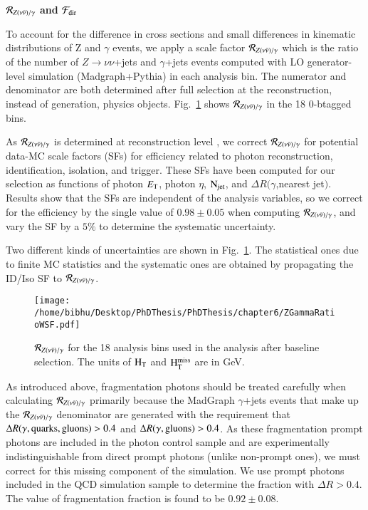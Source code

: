 {\bf ${\cal R}_{Z(\nu\bar{\nu})/\gamma}$ and ${\cal F}_{\rm dir}$}

To account for the difference in cross sections and small differences 
in kinematic distributions of Z and $\gamma$ events, we apply a scale 
factor ${\cal R}_{Z(\nu\bar{\nu})/\gamma}$ which is the ratio of the 
number of $Z\to\nu\nu$+jets and $\gamma$+jets events computed with 
LO generator-level simulation ({\sc Madgraph}+{\sc Pythia}) 
in each analysis bin.  The numerator and denominator are both determined 
after full selection at the reconstruction, instead of generation, physics 
objects. Fig.~\ref{fig:rzg} shows ${\cal R}_{Z(\nu\bar{\nu})/\gamma}$ in the 18 0-btagged bins. 


As ${\cal R}_{Z(\nu\bar{\nu})/\gamma}$ is determined at reconstruction level , we correct ${\cal R}_{Z(\nu\bar{\nu})/\gamma}$ for potential data-MC scale factors (SFs)  for efficiency related to photon reconstruction,  identification, isolation, and trigger.  
These SFs have been computed for our selection as functions of photon $E_{\rm T}$, photon 
$\eta$, $\rm N_{jet}$, and $\Delta R(\gamma$,nearest jet$)$.  Results show that 
the SFs are independent of the analysis variables, so we correct for the efficiency by the 
single value of $0.98\pm0.05$ when computing ${\cal R}_{Z(\nu\bar{\nu})/\gamma}$, and  
vary the SF by a $5\%$ to determine the systematic uncertainty.

Two different kinds of uncertainties are shown in Fig.~\ref{fig:rzg}. The statistical ones due to finite MC statistics and the systematic ones are obtained by propagating the ID/Iso SF to  ${\cal R}_{Z(\nu\bar{\nu})/\gamma}$.
  
\begin{figure}[h]
\begin{center}
  \texttt{[image: /home/bibhu/Desktop/PhDThesis/PhDThesis/chapter6/ZGammaRatioWSF.pdf]} %
  \caption{${\cal R}_{Z(\nu\bar{\nu})/\gamma}$ for the 18 analysis bins used in the analysis after baseline selection. The units of $\rm H_{T}$ and $\rm H_{T}^{miss}$  are in GeV.}
  \label{fig:rzg}
\end{center}
\end{figure}

As introduced above, fragmentation photons should be treated carefully when calculating 
${\cal R}_{Z(\nu\bar{\nu})/\gamma}$ primarily because the {\sc MadGraph} $\gamma$+jets events 
that make up the ${\cal R}_{Z(\nu\bar{\nu})/\gamma}$ denominator are generated with the 
requirement that $\Delta R(\gamma,{\rm quarks,gluons})>0.4$ and $\Delta R(\gamma,{\rm gluons})>0.4$.
As these fragmentation prompt photons are included in the photon control sample 
and are experimentally indistinguishable from direct prompt photons (unlike non-prompt 
 ones), we must correct for this missing component of the simulation.  We use prompt 
photons included in the QCD simulation sample to determine the fraction with $\Delta R>0.4$. The value of fragmentation fraction is found to be $0.92 \pm 0.08$.








